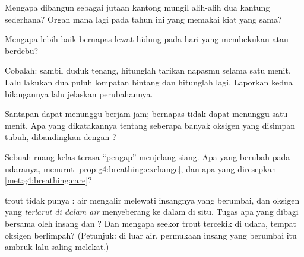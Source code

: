 \begin{exercise}[$\star$]\label{exo:g4:breathing:6}
Mengapa  dibangun sebagai jutaan kantong mungil alih-alih dua
kantung sederhana? Organ mana lagi pada tahun ini yang memakai kiat
yang sama?
\end{exercise}

\begin{exercise}[$\star$]\label{exo:g4:breathing:7}
Mengapa lebih baik bernapas lewat hidung pada hari yang membekukan
atau berdebu?
\end{exercise}

\begin{exercise}[$\star$]\label{exo:g4:breathing:8}
Cobalah: sambil duduk tenang, hitunglah tarikan napasmu selama satu
menit. Lalu lakukan dua puluh lompatan bintang dan hitunglah lagi.
Laporkan kedua bilangannya lalu jelaskan perubahannya.
\end{exercise}

\begin{exercise}[$\star\star$]\label{exo:g4:breathing:9}
Santapan dapat menunggu berjam-jam; bernapas tidak dapat menunggu satu
menit. Apa yang dikatakannya tentang seberapa banyak oksigen yang
disimpan tubuh, dibandingkan dengan ?
\end{exercise}

\begin{exercise}[$\star\star$]\label{exo:g4:breathing:10}
Sebuah ruang kelas terasa ``pengap'' menjelang siang. Apa yang berubah
pada udaranya, menurut \cref{prop:g4:breathing:exchange}, dan apa yang
diresepkan \cref{met:g4:breathing:care}?
\end{exercise}

\begin{exercise}[$\star\star\star$]\label{exo:g4:breathing:11}
 trout tidak punya : air mengalir melewati insangnya yang
berumbai, dan oksigen yang \emph{terlarut di dalam air} menyeberang ke
dalam  di situ. Tugas apa yang dibagi bersama oleh insang dan
? Dan mengapa seekor  trout tercekik di udara, tempat
oksigen berlimpah? (Petunjuk: di luar air, permukaan insang yang
berumbai itu ambruk lalu saling melekat.)
\end{exercise}
